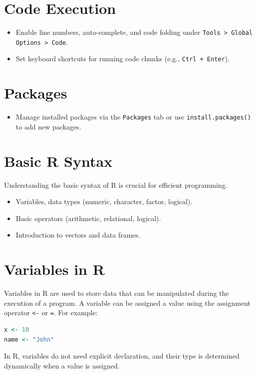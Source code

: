 \documentclass[10pt]{book}
\begin{document}
\section{Code Execution}
\begin{itemize}
    \item Enable line numbers, auto-complete, and code folding under \texttt{Tools > Global Options > Code}.
    \item Set keyboard shortcuts for running code chunks (e.g., \texttt{Ctrl + Enter}).
\end{itemize}

\section{Packages}
\begin{itemize}
    \item Manage installed packages via the \texttt{Packages} tab or use \texttt{install.packages()} to add new packages.
\end{itemize}





\section{Basic R Syntax}
Understanding the basic syntax of R is crucial for efficient programming.
\begin{itemize}
    \item Variables, data types (numeric, character, factor, logical).
    \item Basic operators (arithmetic, relational, logical).
    \item Introduction to vectors and data frames.
\end{itemize}





\section{Variables in R}
Variables in R are used to store data that can be manipulated during the execution of a program. A variable can be assigned a value using the assignment operator \texttt{<-} or \texttt{=}. For example:
\begin{lstlisting}[language=R]
x <- 10
name <- "John"
\end{lstlisting}
In R, variables do not need explicit declaration, and their type is determined dynamically when a value is assigned.
\end{document}
